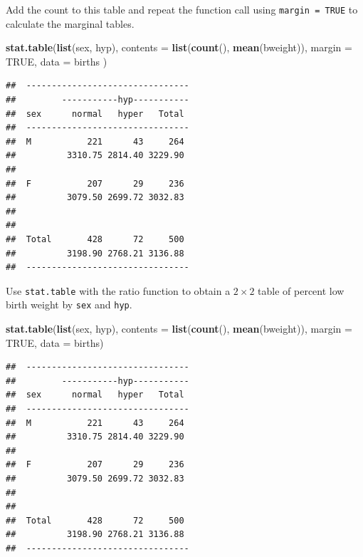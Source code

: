 \documentclass[
]{book}
\newenvironment{Shaded}{\begin{snugshade}}{\end{snugshade}}
\newcommand{\AttributeTok}[1]{\textcolor[rgb]{0.13,0.29,0.53}{#1}}
\newcommand{\ConstantTok}[1]{\textcolor[rgb]{0.56,0.35,0.01}{#1}}
\newcommand{\FunctionTok}[1]{\textcolor[rgb]{0.13,0.29,0.53}{\textbf{#1}}}
\newcommand{\NormalTok}[1]{#1}
\theoremstyle{definition}
\theoremstyle{definition}
\theoremstyle{definition}
\theoremstyle{definition}
\theoremstyle{remark}
\begin{document}
Add the count to this table and repeat the function call using \texttt{margin\ =\ TRUE} to calculate the
marginal tables.

\begin{Shaded}
\begin{Highlighting}[]
\FunctionTok{stat.table}\NormalTok{(}\FunctionTok{list}\NormalTok{(sex, hyp),}
  \AttributeTok{contents =} \FunctionTok{list}\NormalTok{(}\FunctionTok{count}\NormalTok{(), }\FunctionTok{mean}\NormalTok{(bweight)),}
  \AttributeTok{margin =} \ConstantTok{TRUE}\NormalTok{, }
  \AttributeTok{data =}\NormalTok{ births}
\NormalTok{)}
\end{Highlighting}
\end{Shaded}

\begin{verbatim}
##  -------------------------------- 
##         -----------hyp----------- 
##  sex      normal   hyper   Total  
##  -------------------------------- 
##  M           221      43     264  
##          3310.75 2814.40 3229.90  
##                                   
##  F           207      29     236  
##          3079.50 2699.72 3032.83  
##                                   
##                                   
##  Total       428      72     500  
##          3198.90 2768.21 3136.88  
##  --------------------------------
\end{verbatim}

Use \texttt{stat.table} with the ratio function to obtain a \(2\times 2\) table of percent low birth weight by \texttt{sex} and \texttt{hyp}.

\begin{Shaded}
\begin{Highlighting}[]
\FunctionTok{stat.table}\NormalTok{(}\FunctionTok{list}\NormalTok{(sex, hyp), }\AttributeTok{contents =} \FunctionTok{list}\NormalTok{(}\FunctionTok{count}\NormalTok{(), }\FunctionTok{mean}\NormalTok{(bweight)), }\AttributeTok{margin =} \ConstantTok{TRUE}\NormalTok{, }\AttributeTok{data =}\NormalTok{ births)}
\end{Highlighting}
\end{Shaded}

\begin{verbatim}
##  -------------------------------- 
##         -----------hyp----------- 
##  sex      normal   hyper   Total  
##  -------------------------------- 
##  M           221      43     264  
##          3310.75 2814.40 3229.90  
##                                   
##  F           207      29     236  
##          3079.50 2699.72 3032.83  
##                                   
##                                   
##  Total       428      72     500  
##          3198.90 2768.21 3136.88  
##  --------------------------------
\end{verbatim}
\end{document}
